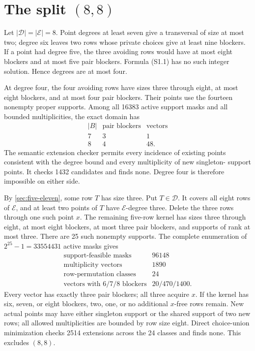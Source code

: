 \documentclass[11pt,a4paper]{article}
\theoremstyle{definition}
\newcommand{\blocker}{B}
\begin{document}
\section{The split \texorpdfstring{$(8,8)$}{(8,8)}}
\label{sec:eight-eight}

Let $|\mathcal D|=|\mathcal E|=8$.  Point degrees at least seven give a
transversal of size at most two; degree six leaves two rows whose private
choices give at least nine blockers.  If a point had degree five, the three
avoiding rows would have at most eight blockers and at most five pair
blockers.  Formula (S1.1) has no such integer solution.  Hence degrees are at
most four.

At degree four, the four avoiding rows have sizes three through eight, at
most eight blockers, and at most four pair blockers.  Their points use the
fourteen nonempty proper supports.  Among all 16383 active support masks and
all bounded multiplicities, the exact domain has
\[
\begin{array}{c|c|r}
|\blocker|&\text{pair blockers}&\text{vectors}\\
\hline
7&3&1\\
8&4&48.
\end{array}                                                   \tag{S8.1}
\]
The semantic extension checker permits every incidence of existing points
consistent with the degree bound and every multiplicity of new singleton-
support points.  It checks 1432 candidates and finds none.  Degree four is
therefore impossible on either side.

By \cref{sec:five-eleven}, some row $T$ has size three.  Put
$T\in\mathcal D$.  It covers all eight rows of $\mathcal E$, and at least two
points of $T$ have $\mathcal E$-degree three.  Delete the three rows through
one such point $x$.  The remaining five-row kernel has sizes three through
eight, at most eight blockers, at most three pair blockers, and supports of
rank at most three.  There are 25 such nonempty supports.  The complete
enumeration of $2^{25}-1=33554431$ active masks gives
\[
\begin{array}{lr}
\text{support-feasible masks}&96148\\
\text{multiplicity vectors}&1890\\
\text{row-permutation classes}&24\\
\text{vectors with 6/7/8 blockers}&20/470/1400.
\end{array}                                                   \tag{S8.2}
\]
Every vector has exactly three pair blockers; all three acquire $x$.  If the
kernel has six, seven, or eight blockers, two, one, or no additional
$x$-free rows remain.  New actual points may have either singleton support
or the shared support of two new rows; all allowed multiplicities are
bounded by row size eight.  Direct choice-union minimization checks 2514
extensions across the 24 classes and finds none.  This excludes $(8,8)$.
\end{document}
